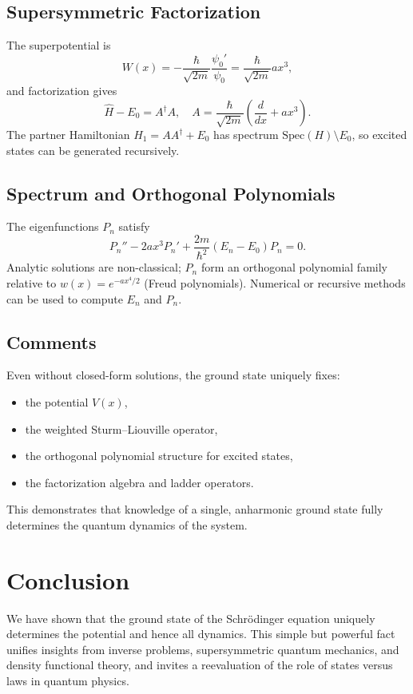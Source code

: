 \documentclass[11pt]{article}
\begin{document}
\subsection{Supersymmetric Factorization}
The superpotential is
\begin{equation}
W(x) = -\frac{\hbar}{\sqrt{2m}} \frac{\psi_0'}{\psi_0} = \frac{\hbar}{\sqrt{2m}} a x^3,
\end{equation}
and factorization gives
\begin{equation}
\hat H - E_0 = A^\dagger A, \quad A = \frac{\hbar}{\sqrt{2m}} \left(\frac{d}{dx} + a x^3\right).
\end{equation}
The partner Hamiltonian $H_1 = A A^\dagger + E_0$ has spectrum $\mathrm{Spec}(H) \setminus {E_0}$, so excited states can be generated recursively.

\subsection{Spectrum and Orthogonal Polynomials}
The eigenfunctions $P_n$ satisfy
\begin{equation}
P_n'' - 2 a x^3 P_n' + \frac{2m}{\hbar^2}(E_n - E_0) P_n = 0.
\end{equation}
Analytic solutions are non-classical; $P_n$ form an orthogonal polynomial family relative to $w(x) = e^{-a x^4/2}$ (Freud polynomials). Numerical or recursive methods can be used to compute $E_n$ and $P_n$.

\subsection{Comments}
Even without closed-form solutions, the ground state uniquely fixes:
\begin{itemize}
\item the potential $V(x)$,
\item the weighted Sturm--Liouville operator,
\item the orthogonal polynomial structure for excited states,
\item the factorization algebra and ladder operators.
\end{itemize}
This demonstrates that knowledge of a single, anharmonic ground state fully determines the quantum dynamics of the system.
\section{Conclusion}
We have shown that the ground state of the Schr\"odinger equation uniquely determines the potential and hence all dynamics. This simple but powerful fact unifies insights from inverse problems, supersymmetric quantum mechanics, and density functional theory, and invites a reevaluation of the role of states versus laws in quantum physics.
\end{document}

